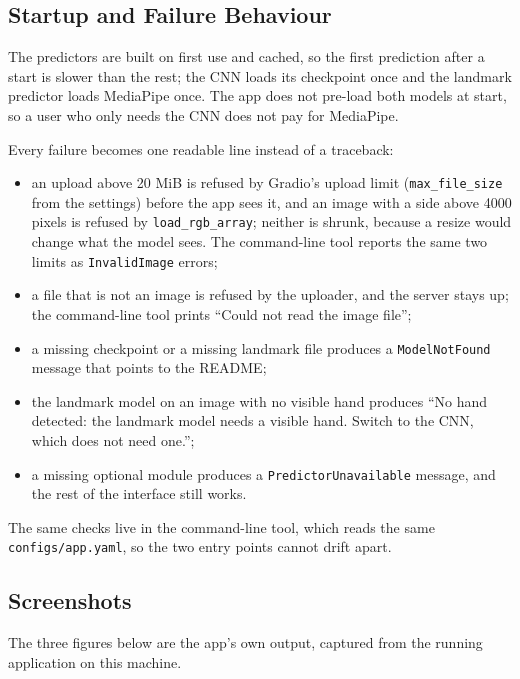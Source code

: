 \subsection{Startup and Failure Behaviour}

The predictors are built on first use and cached, so the first prediction after a start is slower than the rest; the CNN loads its checkpoint once and the landmark predictor loads MediaPipe once. The app does not pre-load both models at start, so a user who only needs the CNN does not pay for MediaPipe.

Every failure becomes one readable line instead of a traceback:

\begin{itemize}
\item an upload above 20 MiB is refused by Gradio's upload limit (\texttt{max\_file\_size} from the settings) before the app sees it, and an image with a side above 4000 pixels is refused by \texttt{load\_rgb\_array}; neither is shrunk, because a resize would change what the model sees. The command-line tool reports the same two limits as \texttt{InvalidImage} errors;
\item a file that is not an image is refused by the uploader, and the server stays up; the command-line tool prints ``Could not read the image file'';
\item a missing checkpoint or a missing landmark file produces a \texttt{ModelNotFound} message that points to the README;
\item the landmark model on an image with no visible hand produces ``No hand detected: the landmark model needs a visible hand. Switch to the CNN, which does not need one.'';
\item a missing optional module produces a \texttt{PredictorUnavailable} message, and the rest of the interface still works.
\end{itemize}

The same checks live in the command-line tool, which reads the same \texttt{configs/app.yaml}, so the two entry points cannot drift apart.

\subsection{Screenshots}

The three figures below are the app's own output, captured from the running application on this machine.


